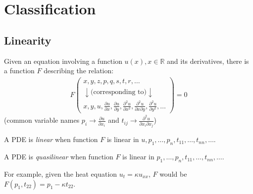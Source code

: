 \section{Classification}\label{sec:classification}
\begin{center}
\end{center}

\subsection{Linearity}\label{subsec:linearity}
Given an equation involving a function $u(x), x\in\mathbb{R}$ and its derivatives,
there is a function $F$ describing the relation:
\begin{align*}
    F\left(
    \begin{matrix}
        x,y,z,p,q,s,t,r,\ldots                         \\
        \downarrow \text{(corresponding to)}\downarrow \\
        x, y, u, \frac{\partial u}{\partial x}, \frac{\partial u}{\partial y}, \frac{\partial^2 u}{\partial x^2},
        \frac{\partial^2 u}{\partial x\partial y},\frac{\partial^2 u}{\partial y^2}, \ldots
    \end{matrix}
    \right) = 0
\end{align*}
(common variable names $p_i\rightarrow\frac{\partial u}{\partial x_i}$ and
$t_{ij} \rightarrow\frac{\partial^2 u}{\partial x_i\partial x_j}$)

A PDE is \emph{linear} when function $F$ is linear in $u,p_1,\ldots,p_n,t_{11},\ldots,t_{nn},\ldots.$

A PDE is \emph{quasilinear} when function $F$ is linear in $p_1,\ldots,p_n,t_{11},\ldots,t_{nn},\ldots.$

For example, given the heat equation $u_t=\kappa u_{xx}$, $F$ would be $F(p_1,t_{22})=p_1-\kappa t_{22}$.

